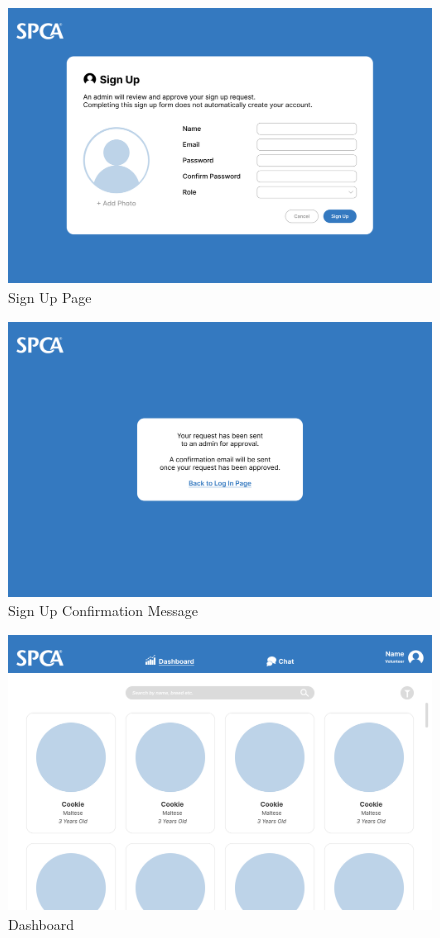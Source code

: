 \begin{figure}[h]
\centering
\includegraphics[width=\textwidth]{proposal/parts/sign-up.png}
\caption{Sign Up Page}
\end{figure}


\begin{figure}[h]
\centering
\includegraphics[width=\textwidth]{proposal/parts/sign-up-confirm.png}
\caption{Sign Up Confirmation Message}
\end{figure}

\begin{figure}[h]
\centering
\includegraphics[width=\textwidth]{proposal/parts/dashboard.png}
\caption{Dashboard}
\end{figure}

